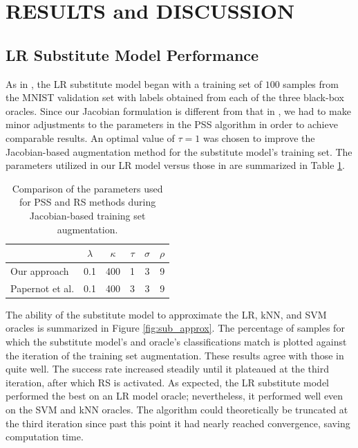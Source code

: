 \section{RESULTS and DISCUSSION}

\subsection{LR Substitute Model Performance} \label{subsec:sub_model}

As in \cite{papernot3}, the LR substitute model began with a training set of $100$ samples from the MNIST validation set with labels obtained from each of the three black-box oracles. Since our Jacobian formulation is different from that in \cite{papernot3}, we had to make minor adjustments to the parameters in the PSS algorithm in order to achieve comparable results. An optimal value of $\tau = 1$ was chosen to improve the Jacobian-based augmentation method for the substitute model's training set. The parameters utilized in our LR model versus those in \cite{papernot3} are summarized in Table \ref{tab:params}. 

\begin{table}[h]
	\caption{Comparison of the parameters used for PSS and RS methods during Jacobian-based training set augmentation.}
	\vskip 0.15in
 \label{tab:params}
\begin{center}
	\begin{small}
		\begin{sc}
			\begin{tabular}{lccccr}
				\hline
				\abovespace\belowspace
				& $\lambda$ & $\kappa$ & $\tau$ & $\sigma$ & $\rho$ \\
				\hline
				\abovespace
				Our approach & 0.1 & 400 & 1 & 3 & 9 \\
				Papernot et al. & 0.1 & 400 & 3 & 3 & 9 \\
				\hline
			\end{tabular}
		\end{sc}
	\end{small}
\end{center}
\vskip -0.1in
\end{table}

The ability of the substitute model to approximate the LR, kNN, and SVM oracles is summarized in Figure \ref{fig:sub_approx}. The percentage of samples for which the substitute model's and oracle's classifications match is plotted against the iteration of the training set augmentation. These results agree with those in \cite{papernot3} quite well. The success rate increased steadily until it plateaued at the third iteration, after which RS is activated. As expected, the LR substitute model performed the best on an LR model oracle; nevertheless, it performed well even on the SVM and kNN oracles. The algorithm could theoretically be truncated at the third iteration since past this point it had nearly reached convergence, saving computation time.


